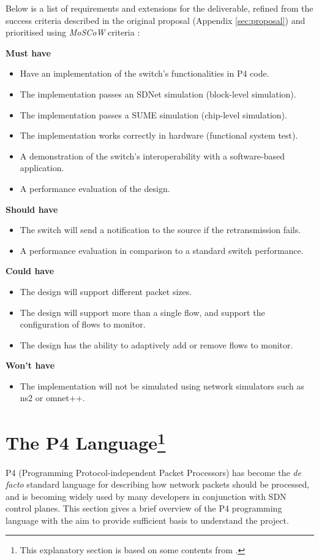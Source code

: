Below is a list of requirements and extensions for the deliverable, refined from the success criteria described in the original proposal (Appendix \ref{sec:proposal}) and prioritised using \textit{MoSCoW} criteria \cite{moscow}:

\textbf{Must have}
\begin{itemize}[leftmargin=*, noitemsep]
	\item Have an implementation of the switch's functionalities in P4 code. 
	\item The implementation passes an SDNet simulation (block-level simulation).
	\item The implementation passes a SUME simulation (chip-level simulation).
	\item The implementation works correctly in hardware (functional system test).
	\item A demonstration of the switch's interoperability with a software-based application.
	\item A performance evaluation of the design.
\end{itemize}

\textbf{Should have}
\begin{itemize}[leftmargin=*, noitemsep]
	\item The switch will send a notification to the source if the retransmission fails.
	\item A performance evaluation in comparison to a standard switch performance.
\end{itemize}

\textbf{Could have}
\begin{itemize}[leftmargin=*, noitemsep]
	\item The design will support different packet sizes.
	\item The design will support more than a single flow, and support the configuration of flows to monitor.
	\item The design has the ability to adaptively add or remove flows to monitor.
\end{itemize}

\textbf{Won't have}
\begin{itemize}[leftmargin=*, noitemsep]
	\item The implementation will not be simulated using network simulators such as ns2 or omnet++.
\end{itemize}

\section[The P4 Language]{The P4 Language\footnote{This explanatory section is based on some contents from \cite{bosshart2014p4, p4spec, fpga19}.}}
\label{sec:p4}
P4 (Programming Protocol-independent Packet Processors) has become the \textit{de facto} standard language for describing how network packets should be processed, and is becoming widely used by many developers in conjunction with SDN control planes. This section gives a brief overview of the P4 programming language with the aim to provide sufficient basis to understand the project.

